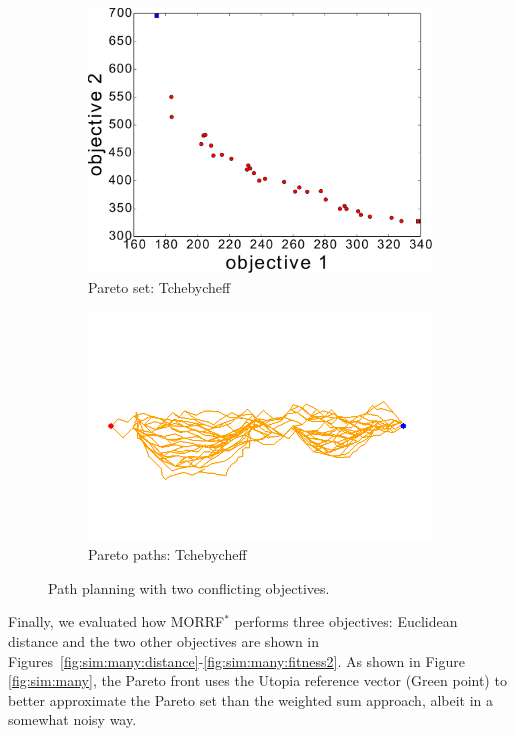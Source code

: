 \documentclass{article}
\begin{document}
\begin{figure}
\begin{subfigure}[b]{0.45\linewidth}
		\includegraphics[width=\textwidth]{fig/sim9-nconvex/PF03-MORRT2.pdf}
		\caption{Pareto set: Tchebycheff}
		\label{fig:sim:nonconvex:pf:b}
	\end{subfigure} 
	\begin{subfigure}[b]{0.45\linewidth}
		\centering
		\includegraphics[width=\textwidth]{fig/sim9-nconvex/MORRTstar03-ALL.png}
		\caption{Pareto paths: Tchebycheff}
		\label{fig:sim:nonconvex:sols:b}
	\end{subfigure}
	\caption{Path planning with two conflicting objectives.}
	\label{fig:sim:nonconvex}
\end{figure}

Finally, we evaluated how MORRF$^{*}$ performs three objectives: 
Euclidean distance and the two other objectives are shown in Figures~\ref{fig:sim:many:distance}-\ref{fig:sim:many:fitness2}.
As shown in Figure \ref{fig:sim:many}, the Pareto front uses the Utopia reference vector (Green point) to better approximate the Pareto set than the weighted sum approach, albeit in a somewhat noisy way.
\end{document}
